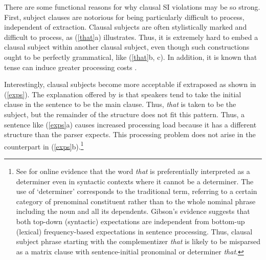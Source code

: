 \documentclass[output=paper
                ,modfonts
                ,nonflat
	        ,collection
	        ,collectionchapter
	        ,collectiontoclongg
 	        ,biblatex
                ,babelshorthands
                ,newtxmath
                ,draftmode
                ,colorlinks, citecolor=brown
]{./langsci/langscibook}
\begin{document}
\zl

%



There are some functional reasons for why clausal SI violations may be so strong. First, subject clauses are notorious for being particularly difficult to process, independent of extraction. Clausal  subjects  are often  stylistically marked and difficult  to process,   as  (\ref{that}a) illustrates. Thus, it is extremely hard to embed a  clausal subject within another clausal subject, even though such constructions ought to be perfectly grammatical,  like (\ref{that}b, c). In addition, it is known that tense can induce greater processing costs
 \citep{kluender92,gibson0000}. 

\eal  \label{that}

 
\zl


\noindent
 Interestingly, clausal subjects become more acceptable if  extraposed as shown in (\ref{exps}).
The explanation offered by  \citet[356--357]{fod74} is that speakers tend to  take the initial clause in the sentence  to be the  main clause. Thus, \emph{that} is taken to be the subject, but the remainder
of the structure does not fit this pattern. Thus, a sentence like (\ref{exps}a) causes
 increased  processing  load  because  it has a  different structure 
than the parser expects.
This processing problem does not arise
in the counterpart in (\ref{exps}b).\footnote{See  \citet{gibson07} for online evidence
that  the word \emph{that} is preferentially interpreted as a determiner even in syntactic contexts where it cannot be a determiner. The use of `determiner' corresponds to the traditional term, referring to a certain category of
 prenominal constituent rather than to the whole nominal phrase including the noun and all its dependents.
 Gibson's evidence suggests that both top-down (syntactic) expectations are independent from bottom-up (lexical) frequency-based expectations in sentence processing. Thus, 
clausal subject phrase  starting with the complementizer
\emph{that} is likely to be misparsed as a matrix clause with sentence-initial  pronominal or determiner \emph{that}.}
\end{document}
